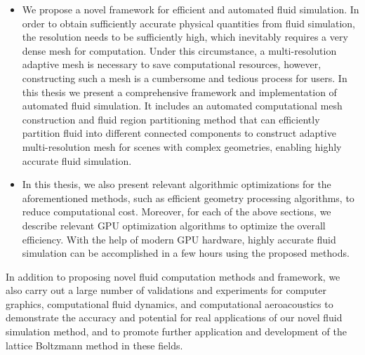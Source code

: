 \begin{abstract*}[flattitle]
\begin{itemize}
    \item We propose a novel framework for efficient and automated fluid simulation. In order to obtain sufficiently accurate physical quantities from fluid simulation, the resolution needs to be sufficiently high, which inevitably requires a very dense mesh for computation. Under this circumstance, a multi-resolution adaptive mesh is necessary to save computational resources, however, constructing such a mesh is a cumbersome and tedious process for users. In this thesis we present a comprehensive framework and implementation of automated fluid simulation. It includes an automated computational mesh construction and fluid region partitioning method that can efficiently partition fluid into different connected components to construct adaptive multi-resolution mesh for scenes with complex geometries, enabling highly accurate fluid simulation.
    \item In this thesis, we also present relevant algorithmic optimizations for the aforementioned methods, such as efficient geometry processing algorithms, to reduce computational cost. Moreover, for each of the above sections, we describe relevant GPU optimization algorithms to optimize the overall efficiency. With the help of modern GPU hardware, highly accurate fluid simulation can be accomplished in a few hours using the proposed methods.
  \end{itemize}

  In addition to proposing novel fluid computation methods and framework, we also carry out a large number of validations and experiments for computer graphics, computational fluid dynamics, and computational aeroacoustics to demonstrate the accuracy and potential for real applications of our novel fluid simulation method, and to promote further application and development of the lattice Boltzmann method in these fields.
\end{abstract*}